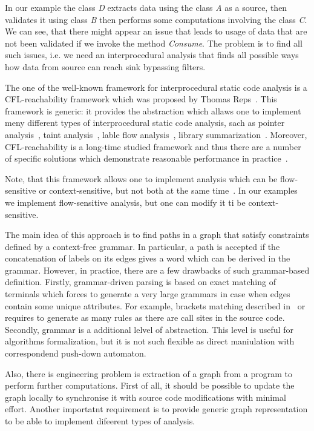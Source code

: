 In our example the class \textit{D} extracts data using the class \textit{A} as a source, then validates it using class \textit{B} then performs some computations involving the class \textit{C}.
We can see, that there might appear an issue that leads to usage of data that are not been validated if we invoke the method \textit{Consume}.
The problem is to find all such issues, i.e. we need an interprocedural analysis that finds all possible ways how data from source can reach sink bypassing filters.

The one of the well-known framework for interprocedural static code analysis is a CFL-reachability framework which was proposed by Thomas Reps~\cite{Reps}.
This framework is generic: it provides the abstraction which allaws one to implement meny different types of interprocedural static code analysis, sach as pointer analysis~\cite{Zheng, JavaCFL}, taint analysis~\cite{Huang:2015:SPT:2771783.2771803}, lable flow analysis~\cite{10.1007/11823230_7,CFLr}, library summarization~\cite{10.1007/978-3-662-54434-1_33}.
Moreover, CFL-reachability is a long-time studied framework and thus there are a number of specific solutions which demonstrate reasonable performance in practice~\cite{Wang:2017:GSD:3093315.3037744}.

Note, that this framework allows one to implement analysis which can be flow-sensitive or context-sensitive, but not both at the same time~\cite{Reps:2000:UCD:345099.345137}. In our examples we implement flow-sensitive analysis, but one can modify it ti be context-sensitive.

The main idea of this approach is to find paths in a graph that satisfy constraints defined by a context-free grammar.
In particular, a path is accepted if the concatenation of labels on its edges gives a word which can be derived in the grammar.
However, in practice, there are a few drawbacks of such grammar-based definition.
Firstly, grammar-driven parsing is based on exact matching of terminals which forces to generate a very large grammars in case when edges contain some unique attributes.
For example, brackets matching described in~\cite{CFLr} or~\cite{Zheng, JavaCFL} requires to generate as many rules as there are call sites in the source code.
Secondly, grammar is a additional lelvel of abstraction.
This level is useful for algorithms formalization, but it is not such flexible as direct maniulation with correspondend push-down automaton.

Also, there is engineering problem is extraction of a graph from a program to perform further computations.
First of all, it should be possible to update the graph locally to synchronise it with source code modifications with minimal effort.
Another importatnt requirement is to provide generic graph representation to be able to implement difeerent types of analysis. 

